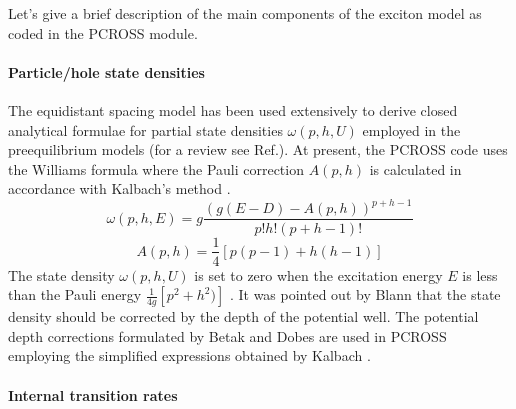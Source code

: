 Let's give a brief description of the main components of the exciton model
as coded in the PCROSS module.

\paragraph{Particle/hole state densities}

The equidistant spacing model has been used extensively to derive closed
analytical formulae for partial state densities $\omega (p,h,U)$ employed in
the preequilibrium models (for a review see Ref.\cite{ripl2}). At present,
the PCROSS code uses the Williams formula \cite{wi71} where the Pauli
correction $A(p,h)$ is calculated in accordance with Kalbach's method \cite%
{ka83}. 
\begin{equation}
\omega (p,h,E)=g\frac{\left( g(E-D)-A(p,h)\right) ^{p+h-1}}{p!h!(p+h-1)!}
\end{equation}%
\begin{equation*}
A(p,h)=\frac{1}{4}\left[ p(p-1)+h(h-1)\right]
\end{equation*}%
The state density $\omega (p,h,U)$ is set to zero when the excitation energy 
$E$ is less than the Pauli energy $\frac{1}{4g}\left[ p^{2}+h^{2})\right] $ 
\cite{bacape89}. It was pointed out by Blann \cite{bl72} that the state
density should be corrected by the depth of the potential well. The
potential depth corrections formulated by Betak and Dobes \cite{bedo76} are
used in PCROSS employing the simplified expressions obtained by Kalbach \cite%
{ka77,ka83}.

\paragraph{Internal transition rates}


